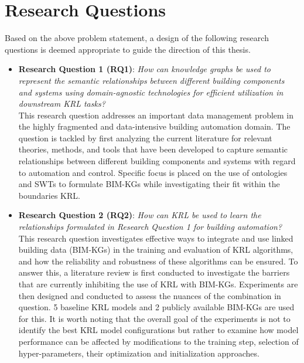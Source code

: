 \section{Research Questions}
\label{sec:research questions}
Based on the above problem statement, a design of the following research questions is deemed appropriate to guide the direction of this thesis.
\begin{itemize}
    \item 
    \textbf{Research Question 1 (RQ1)}: \textit{How can knowledge graphs be used to represent the semantic relationships between different building components and systems using domain-agnostic technologies for efficient utilization in downstream \ac{KRL} tasks?}\\

    This research question addresses an important data management problem in the highly fragmented and data-intensive building automation domain. The question is tackled by first analyzing the current literature for relevant theories, methods, and tools that have been developed to capture semantic relationships between different building components and systems with regard to automation and control. Specific focus is placed on the use of ontologies and \acp{SWT} to formulate \acp{BIM-KG} while investigating their fit within the boundaries \ac{KRL}.\\
    
    \item 
    \textbf{Research Question 2 (RQ2)}: \textit{How can \ac{KRL} be used to learn the relationships formulated in Research Question 1 for building automation?} \\

    This research question investigates effective ways to integrate and use linked building data (\acp{BIM-KG}) in the training and evaluation of \ac{KRL} algorithms, and how the reliability and robustness of these algorithms can be ensured. To answer this, a literature review is first conducted to investigate the barriers that are currently inhibiting the use of \ac{KRL} with \acp{BIM-KG}. Experiments are then designed and conducted to assess the nuances of the combination in question. 5 baseline \ac{KRL} models and 2 publicly available \acp{BIM-KG} are used for this. It is worth noting that the overall goal of the experiments is not to identify the best \ac{KRL} model configurations but rather to examine how model performance can be affected by modifications to the training step, selection of hyper-parameters, their optimization and initialization approaches.


\end{itemize}
